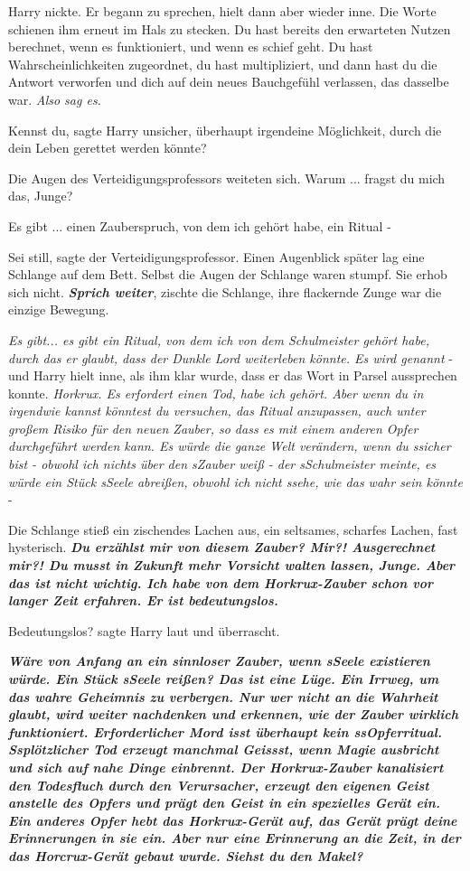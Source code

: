 Harry nickte. Er begann zu sprechen, hielt dann aber wieder inne. Die Worte
schienen ihm erneut im Hals zu stecken. Du hast bereits den erwarteten Nutzen
berechnet, wenn es funktioniert, und wenn es schief geht. Du hast
Wahrscheinlichkeiten zugeordnet, du hast multipliziert, und dann hast du die
Antwort verworfen und dich auf dein neues Bauchgefühl verlassen, das dasselbe
war.
\emph{Also sag es.}

\glqq{}Kennst du\grqq{}, sagte Harry unsicher, \glqq{}überhaupt irgendeine
Möglichkeit, durch die dein Leben gerettet werden könnte?\grqq{}

Die Augen des Verteidigungsprofessors weiteten sich. \glqq{}Warum ... fragst du
mich das, Junge?\grqq{}

\glqq{}Es gibt ... einen Zauberspruch, von dem ich gehört habe, ein Ritual -\grqq{}

\glqq{}Sei still\grqq{}, sagte der Verteidigungsprofessor. Einen Augenblick
später lag eine Schlange auf dem Bett. Selbst die Augen der Schlange waren
stumpf. Sie erhob sich nicht. \glqq{}\textbf{\emph{Sprich weiter}}\grqq{},
zischte die Schlange, ihre flackernde Zunge war die einzige Bewegung.

\glqq{}\emph{Es gibt... es gibt ein Ritual, von dem ich von dem Schulmeister
gehört habe, durch das er glaubt, dass der Dunkle Lord weiterleben könnte. Es
wird genannt} -\grqq{} und Harry hielt inne, als ihm klar wurde, dass er das
Wort in Parsel aussprechen konnte. \glqq{}\emph{Horkrux. Es erfordert einen Tod,
habe ich gehört. Aber wenn du in irgendwie kannst könntest du versuchen, das
Ritual anzupassen, auch unter großem Risiko für den neuen Zauber, so dass es mit
einem anderen Opfer durchgeführt werden kann. Es würde die ganze Welt verändern,
wenn du ssicher bist - obwohl ich nichts über den sZauber weiß - der
sSchulmeister meinte, es würde ein Stück sSeele abreißen, obwohl ich nicht
ssehe, wie das wahr sein könnte} -\grqq{}

Die Schlange stieß ein zischendes Lachen aus, ein seltsames, scharfes Lachen,
fast hysterisch. \glqq{}\textbf{\emph{Du erzählst mir von diesem Zauber? Mir?!
Ausgerechnet mir?! Du musst in Zukunft mehr Vorsicht walten lassen, Junge. Aber
das ist nicht wichtig. Ich habe von dem Horkrux-Zauber schon vor langer Zeit
erfahren. Er ist bedeutungslos.\grqq{}} }

\glqq{}Bedeutungslos?\grqq{} sagte Harry laut und überrascht.

\glqq{}\textbf{\emph{Wäre von Anfang an ein sinnloser Zauber, wenn sSeele
existieren würde. Ein Stück sSeele reißen? Das ist eine Lüge. Ein Irrweg, um das
wahre Geheimnis zu verbergen. Nur wer nicht an die Wahrheit glaubt, wird weiter
nachdenken und erkennen, wie der Zauber wirklich funktioniert. Erforderlicher
Mord isst überhaupt kein ssOpferritual. Ssplötzlicher Tod erzeugt manchmal
Geissst, wenn Magie ausbricht und sich auf nahe Dinge einbrennt. Der
Horkrux-Zauber kanalisiert den Todesfluch durch den Verursacher, erzeugt den
eigenen Geist anstelle des Opfers und prägt den Geist in ein spezielles Gerät
ein. Ein anderes Opfer hebt das Horkrux-Gerät auf, das Gerät prägt deine
Erinnerungen in sie ein. Aber nur eine Erinnerung an die Zeit, in der das
Horcrux-Gerät gebaut wurde. Siehst du den Makel?}}\grqq{}

